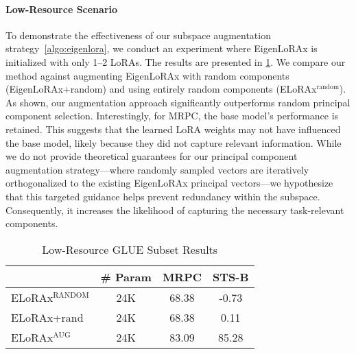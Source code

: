 \paragraph{Low-Resource Scenario} 
To demonstrate the effectiveness of our subspace augmentation strategy~\cref{algo:eigenlora}, we conduct an experiment where EigenLoRAx is initialized with only 1–2 LoRAs. The results are presented in \cref{tab:glue_low}. We compare our method against augmenting EigenLoRAx with random components (EigenLoRAx+random) and using entirely random components (ELoRAx$^{\text{random}}$). As shown, our augmentation approach significantly outperforms random principal component selection. Interestingly, for MRPC, the base model's performance is retained. This suggests that the learned LoRA weights may not have influenced the base model, likely because they did not capture relevant information. While we do not provide theoretical guarantees for our principal component augmentation strategy—where randomly sampled vectors are iteratively orthogonalized to the existing EigenLoRAx principal vectors—we hypothesize that this targeted guidance helps prevent redundancy within the subspace. Consequently, it increases the likelihood of capturing the necessary task-relevant components.
\begin{table}[!h]
    \caption{Low-Resource GLUE Subset Results}
    \begin{center}
    \begin{sc}
    \begin{tabular}{lccc}
        \toprule
         & \# Param & MRPC & STS-B  \\
        \midrule
        ELoRAx$^{\text{RANDOM}}$ & 24K & 68.38 & -0.73 \\
        ELoRAx+rand & 24K  & 68.38 & 0.11  \\
        \rowcolor{gray!20} ELoRAx$^{\text{AUG}}$ & 24K & 83.09 & 85.28 \\
        \bottomrule
    \end{tabular}
    \label{tab:glue_low}
    \end{sc}
    \end{center}
\end{table}
